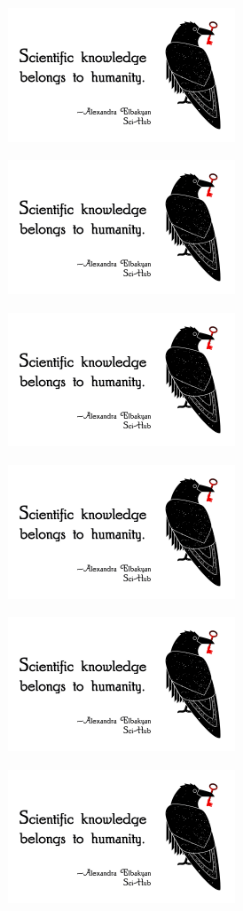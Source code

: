 \documentclass[a4paper,14pt]{extarticle}
\begin{document}
\vspace{2mm}


\parbox[c][34mm]{70mm}{\includegraphics[width=60mm]{humanity-sticker} }
\parbox[c][34mm]{70mm}{\includegraphics[width=60mm]{humanity-sticker} }
\parbox[c][34mm]{70mm}{\includegraphics[width=60mm]{humanity-sticker} }




\parbox[c][34mm]{70mm}{\includegraphics[width=60mm]{humanity-sticker} }
\parbox[c][34mm]{70mm}{\includegraphics[width=60mm]{humanity-sticker} }
\parbox[c][34mm]{70mm}{\includegraphics[width=60mm]{humanity-sticker} }
\end{document}
